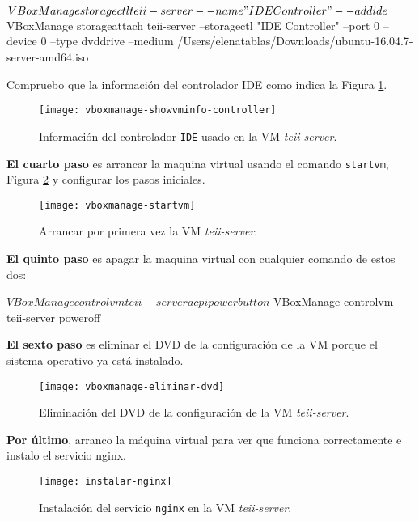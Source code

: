 \begin{listing}[style=consola]
    $ VBoxManage storagectl teii-server --name "IDE Controller" --add ide
    $ VBoxManage storageattach teii-server --storagectl "IDE Controller" --port 0  --device 0 --type dvddrive --medium /Users/elenatablas/Downloads/ubuntu-16.04.7-server-amd64.iso
\end{listing}
\par Compruebo que la información del controlador IDE como indica la Figura \ref{fig:vboxmanage-showvminfo-controller}.
\begin{figure}[H]
    \texttt{[image: vboxmanage-showvminfo-controller]}
    \centering
    \caption{Información del controlador \texttt{IDE} usado en la VM \textit{teii-server}.}
    \label{fig:vboxmanage-showvminfo-controller}
 \end{figure}
 \par \textbf{El cuarto paso} es arrancar la maquina virtual usando el comando \texttt{startvm}, Figura \ref{fig:vboxmanage-startvm} 
 y configurar los pasos iniciales.
\begin{figure}[H]
    \texttt{[image: vboxmanage-startvm]}
    \centering
    \caption{Arrancar por primera vez la VM \textit{teii-server}.}
    \label{fig:vboxmanage-startvm}
\end{figure}
\par \textbf{El quinto paso} es apagar la maquina virtual con cualquier comando de estos dos:
\begin{listing}[style=consola]
    $ VBoxManage controlvm teii-server acpipowerbutton
    $ VBoxManage controlvm teii-server poweroff
\end{listing}
\par \textbf{El sexto paso} es eliminar el DVD de la configuración de la VM porque el sistema operativo ya está instalado.
 \begin{figure}[H]
    \texttt{[image: vboxmanage-eliminar-dvd]}
    \centering
    \caption{Eliminación del DVD de la configuración de la VM \textit{teii-server}.}
    \label{fig:vboxmanage-eliminar-dvd}
\end{figure}
\par \textbf{Por último}, arranco la máquina virtual para ver que funciona correctamente e instalo el servicio nginx.
 \begin{figure}[H]
    \texttt{[image: instalar-nginx]}
    \centering
    \caption{Instalación del servicio \texttt{nginx} en la VM \textit{teii-server}.}
    \label{fig:instalar-nginx}
\end{figure}
 

